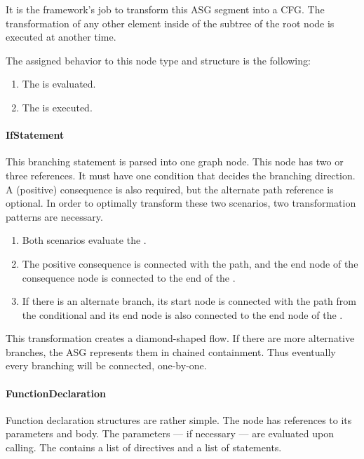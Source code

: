 It is the framework's job to transform this ASG segment into a CFG. The transformation of any other element inside of the subtree of the root  node is executed at another time.

The assigned behavior to this node type and structure is the following:
\begin{enumerate}[topsep=0pt]
	\item The  is evaluated.
	\item The  is executed.
\end{enumerate}


\paragraph{IfStatement}
This branching statement is parsed into one graph node. This node has two or three references. It must have one condition that decides the branching direction. A (positive) consequence is also required, but the alternate path reference is optional. In order to optimally transform these two scenarios, two transformation patterns are necessary.

\begin{enumerate}[topsep=0pt]
	\item Both scenarios evaluate the .
	\item The positive consequence is connected with the  path, and the end node of the consequence node is connected to the end of the .
	\item If there is an alternate branch, its start node is connected with the  path from the conditional  and its end node is also connected to the end node of the .
\end{enumerate}

This transformation creates a diamond-shaped flow. If there are more alternative branches, the ASG represents them in chained containment. Thus eventually every branching will be connected, one-by-one.

\paragraph{FunctionDeclaration}
Function declaration structures are rather simple. The node has references to its parameters and body. The parameters --- if necessary --- are evaluated upon calling. The  contains a list of directives and a list of statements.

